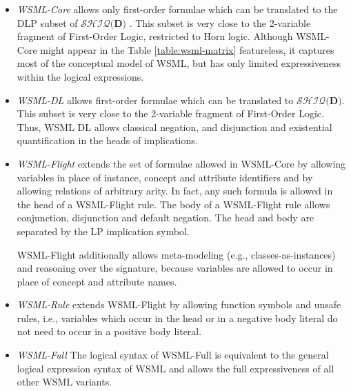 \begin{itemize}
\item \emph{WSML-Core}
allows only first-order formulae which can be translated to the DLP
subset of $\mathcal{SHIQ}(\mathbf{D)}$
\cite{Grosof+HorrocksETAL-DescLogiProg:03}. This subset is very
close to the 2-variable fragment of First-Order Logic, restricted to
Horn logic. Although WSML-Core might appear in the Table
\ref{table:wsml-matrix} featureless, it captures most of the
conceptual model of WSML, but has only limited expressiveness within
the logical expressions.

\item \emph{WSML-DL}
allows first-order formulae which can be translated to
$\mathcal{SHIQ}(\mathbf{D)}$. This subset is very close to the
2-variable fragment of First-Order Logic. Thus, WSML DL allows
classical negation, and disjunction and existential quantification
in the heads of implications.

\item \emph{WSML-Flight}
extends the set of formulae allowed in WSML-Core by allowing
variables in place of instance, concept and attribute identifiers
and by allowing relations of arbitrary arity. In fact, any such
formula is allowed in the head of a WSML-Flight rule. The body of a
WSML-Flight rule allows conjunction, disjunction and default
negation. The head and body are separated by the LP implication
symbol.

WSML-Flight additionally allows meta-modeling (e.g.,
classes-as-instances) and reasoning over the signature, because
variables are allowed to occur in place of concept and attribute
names.

\item \emph{WSML-Rule}
extends WSML-Flight by allowing function symbols and unsafe rules,
i.e., variables which occur in the head or in a negative body
literal do not need to occur in a positive body literal.

\item \emph{WSML-Full}
The logical syntax of WSML-Full is equivalent to the general logical
expression syntax of WSML and allows the full expressiveness of all
other WSML variants.

\end{itemize}

